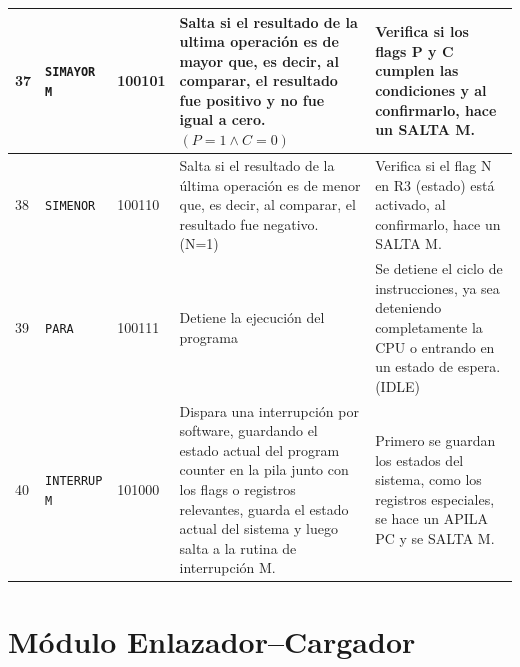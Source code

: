 \documentclass{article}
\begin{document}
\begin{longtable}{|p{}|p{}|p{}|p{}|p{}|}
  \hline
  37                 & \texttt{SIMAYOR M}                               & 100101                          & Salta si el resultado de la ultima operación es de mayor que, es decir, al comparar, el resultado fue positivo y no fue igual a cero. $(P = 1 \land C = 0)$                                                                   & Verifica si los flags P y C cumplen las condiciones y al confirmarlo, hace un SALTA M.                                 \\
  \hline
  38                 & \texttt{SIMENOR}                                 & 100110                          & Salta si el resultado de la última operación es de menor que, es decir, al comparar, el resultado fue negativo.  (N=1)                                                                                                        & Verifica si el flag N en R3 (estado) está activado, al confirmarlo, hace un SALTA M.                                   \\
  \hline
  39                 & \texttt{PARA}                                    & 100111                          & Detiene la ejecución del programa                                                                                                                                                                                             & Se detiene el ciclo de instrucciones, ya sea deteniendo completamente la CPU o entrando en un estado de espera. (IDLE) \\
  \hline
  40                 & \texttt{INTERRUP M}                              & 101000                          & Dispara una interrupción por software, guardando el estado actual del program counter en la pila junto con los flags o registros relevantes, guarda el estado actual del sistema y luego salta a la rutina de interrupción M. & Primero se guardan los estados del sistema, como los registros especiales, se hace un APILA PC y se SALTA M.           \\
  \hline
\end{longtable}




\section{Módulo Enlazador–Cargador}
\end{document}
